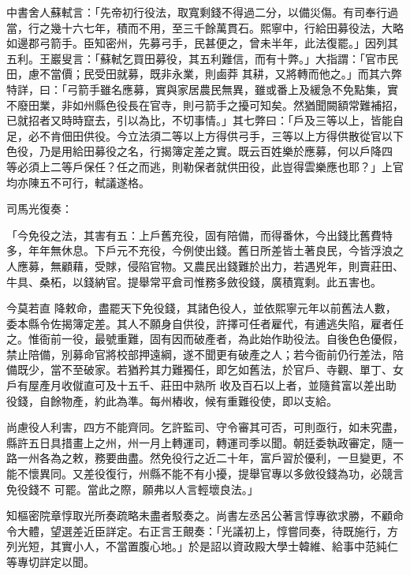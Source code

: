 \begin{pinyinscope}
 中書舍人蘇軾言：「先帝初行役法，取寬剩錢不得過二分，以備災傷。有司奉行過當，行之幾十六七年，積而不用，至三千餘萬貫石。熙寧中，行給田募役法，大略如邊郡弓箭手。臣知密州，先募弓手，民甚便之，曾未半年，此法復罷。」因列其五利。王巖叟言：「蘇軾乞買田募役，其五利難信，而有十弊。」大指謂：「官市民田，慮不當價；民受田就募，既非永業，則鹵莽
 其耕，又將轉而他之。」而其六弊特詳，曰：「弓箭手雖名應募，實與家居農民無異，雖或番上及緩急不免點集，實不廢田業，非如州縣色役長在官寺，則弓箭手之擾可知矣。然猶聞闕額常難補招，已就招者又時時竄去，引以為比，不切事情。」其七弊曰：「戶及三等以上，皆能自足，必不肯佃田供役。今立法須二等以上方得供弓手，三等以上方得供散從官以下色役，乃是用給田募役之名，行揭簿定差之實。既云百姓樂於應募，何以戶降四
 等必須上二等戶保任？任之而逃，則勒保者就供田役，此豈得雲樂應也耶？」上官均亦陳五不可行，軾議遂格。



 司馬光復奏：



 「今免役之法，其害有五：上戶舊充役，固有陪備，而得番休，今出錢比舊費特多，年年無休息。下戶元不充役，今例使出錢。舊日所差皆土著良民，今皆浮浪之人應募，無顧藉，受賕，侵陷官物。又農民出錢難於出力，若遇兇年，則賣莊田、牛具、桑柘，以錢納官。提舉常平倉司惟務多斂役錢，廣積寬剩。此五害也。



 今莫若直
 降敕命，盡罷天下免役錢，其諸色役人，並依熙寧元年以前舊法人數，委本縣令佐揭簿定差。其人不願身自供役，許擇可任者雇代，有逋逃失陷，雇者任之。惟衙前一役，最號重難，固有因而破產者，為此始作助役法。自後色色優假，禁止陪備，別募命官將校部押遠綱，遂不聞更有破產之人；若今衙前仍行差法，陪備既少，當不至破家。若猶矜其力難獨任，即乞如舊法，於官戶、寺觀、單丁、女戶有屋產月收僦直可及十五千、莊田中熟所
 收及百石以上者，並隨貧富以差出助役錢，自餘物產，約此為準。每州樁收，候有重難役使，即以支給。



 尚慮役人利害，四方不能齊同。乞許監司、守令審其可否，可則亟行，如未究盡，縣許五日具措畫上之州，州一月上轉運司，轉運司季以聞。朝廷委執政審定，隨一路一州各為之敕，務要曲盡。然免役行之近二十年，富戶習於優利，一旦變更，不能不懷異同。又差役復行，州縣不能不有小擾，提舉官專以多斂役錢為功，必競言免役錢不
 可罷。當此之際，願弗以人言輕壞良法。」



 知樞密院章惇取光所奏疏略未盡者駁奏之。尚書左丞呂公著言惇專欲求勝，不顧命令大體，望選差近臣詳定。右正言王覿奏：「光議初上，惇嘗同奏，待既施行，方列光短，其實小人，不當置腹心地。」於是詔以資政殿大學士韓維、給事中范純仁等專切詳定以聞。




\end{pinyinscope}
